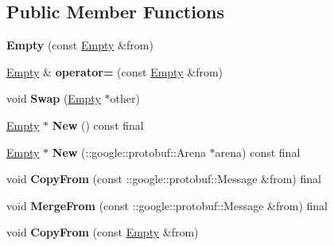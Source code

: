 \subsection*{Public Member Functions}
\begin{DoxyCompactItemize}
\item 
\mbox{\label{classtbMessages_1_1Empty_aa7824763efec590a17437da6c6cb8d41}} 
{\bfseries Empty} (const \hyperlink{classtbMessages_1_1Empty}{Empty} \&from)
\item 
\mbox{\label{classtbMessages_1_1Empty_a9df5a6b35aa1d3a8ff4284985182ec42}} 
\hyperlink{classtbMessages_1_1Empty}{Empty} \& {\bfseries operator=} (const \hyperlink{classtbMessages_1_1Empty}{Empty} \&from)
\item 
\mbox{\label{classtbMessages_1_1Empty_a08f7cbbdf9e391436eff4aca0b0aa43b}} 
void {\bfseries Swap} (\hyperlink{classtbMessages_1_1Empty}{Empty} $\ast$other)
\item 
\mbox{\label{classtbMessages_1_1Empty_a1edf25524dc0b215485563923dbbc258}} 
\hyperlink{classtbMessages_1_1Empty}{Empty} $\ast$ {\bfseries New} () const final
\item 
\mbox{\label{classtbMessages_1_1Empty_a91ff2ecd77c42cd59a84c574e60669b2}} 
\hyperlink{classtbMessages_1_1Empty}{Empty} $\ast$ {\bfseries New} (\+::google\+::protobuf\+::\+Arena $\ast$arena) const final
\item 
\mbox{\label{classtbMessages_1_1Empty_adad5aecdaf0cece96f43f5d672a26712}} 
void {\bfseries Copy\+From} (const \+::google\+::protobuf\+::\+Message \&from) final
\item 
\mbox{\label{classtbMessages_1_1Empty_a018730b17c2c39ebdd83cd72f9ea8e1f}} 
void {\bfseries Merge\+From} (const \+::google\+::protobuf\+::\+Message \&from) final
\item 
\mbox{\label{classtbMessages_1_1Empty_a0f6385ced7a0b262507e8803bcafecef}} 
void {\bfseries Copy\+From} (const \hyperlink{classtbMessages_1_1Empty}{Empty} \&from)
\item 

\end{DoxyCompactItemize}
